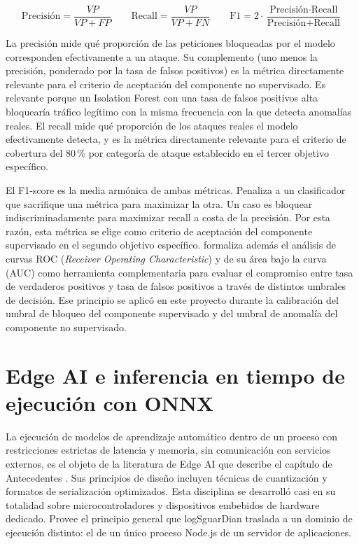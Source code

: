 \begin{equation}
\text{Precisión} = \frac{VP}{VP + FP} \qquad
\text{Recall} = \frac{VP}{VP + FN} \qquad
\text{F1} = 2 \cdot \frac{\text{Precisión} \cdot \text{Recall}}{\text{Precisión} + \text{Recall}}
\end{equation}

La precisión mide qué proporción de las peticiones bloqueadas por el modelo corresponden efectivamente a un ataque. Su complemento (uno menos la precisión, ponderado por la tasa de falsos positivos) es la métrica directamente relevante para el criterio de aceptación del componente no supervisado. Es relevante porque un Isolation Forest con una tasa de falsos positivos alta bloquearía tráfico legítimo con la misma frecuencia con la que detecta anomalías reales. El recall mide qué proporción de los ataques reales el modelo efectivamente detecta, y es la métrica directamente relevante para el criterio de cobertura del 80\,\% por categoría de ataque establecido en el tercer objetivo específico.

El F1-score es la media armónica de ambas métricas. Penaliza a un clasificador que sacrifique una métrica para maximizar la otra. Un caso es bloquear indiscriminadamente para maximizar recall a costa de la precisión. Por esta razón, esta métrica se elige como criterio de aceptación del componente supervisado en el segundo objetivo específico. \textcite{fawcett2006} formaliza además el análisis de curvas ROC (\textit{Receiver Operating Characteristic}) y de su área bajo la curva (AUC) como herramienta complementaria para evaluar el compromiso entre tasa de verdaderos positivos y tasa de falsos positivos a través de distintos umbrales de decisión. Ese principio se aplicó en este proyecto durante la calibración del umbral de bloqueo del componente supervisado y del umbral de anomalía del componente no supervisado.

\section{Edge AI e inferencia en tiempo de ejecución con ONNX}

La ejecución de modelos de aprendizaje automático dentro de un proceso con restricciones estrictas de latencia y memoria, sin comunicación con servicios externos, es el objeto de la literatura de Edge AI que describe el capítulo de Antecedentes \parencite{warden2019}. Sus principios de diseño incluyen técnicas de cuantización y formatos de serialización optimizados. Esta disciplina se desarrolló casi en su totalidad sobre microcontroladores y dispositivos embebidos de hardware dedicado. Provee el principio general que logSguarDian traslada a un dominio de ejecución distinto: el de un único proceso Node.js de un servidor de aplicaciones.

